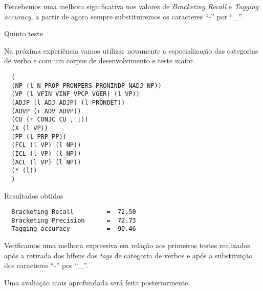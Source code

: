 \normalsize

Percebemos uma melhora significativa nos valores de \emph{Bracketing Recall} e \emph{Tagging accuracy}, a partir de agora sempre substituiremos os caracteres ``{-}'' por ``\_''.

Quinto teste

Na próxima experiência vamos utilizar novamente a especialização das categorias de verbo e com um corpus de desenvolvimento e teste maior.

\scriptsize

\begin{verbatim}
  (
  (NP (l N PROP PRONPERS PRONINDP NADJ NP))
  (VP (l VFIN VINF VPCP VGER) (l VP))
  (ADJP (l ADJ ADJP) (l PRONDET))
  (ADVP (r ADV ADVP))
  (CU (r CONJC CU , ;))
  (X (l VP))
  (PP (l PRP PP))
  (FCL (l VP) (l NP))
  (ICL (l VP) (l NP))
  (ACL (l VP) (l NP))
  (* (l))
  )
\end{verbatim}


Resultados obtidos


\begin{verbatim}
  Bracketing Recall         =  72.50
  Bracketing Precision      =  72.73
  Tagging accuracy          =  90.46
\end{verbatim}

\normalsize
Verificamos uma melhora expressiva em relação aos primeiros testes realizados após a retirada dos hífens das \emph{tags} de categoria de verbos e após a substituição dos caracteres ``{-}'' por ``\_''.

Uma avaliação mais aprofundada será feita posteriormente. 